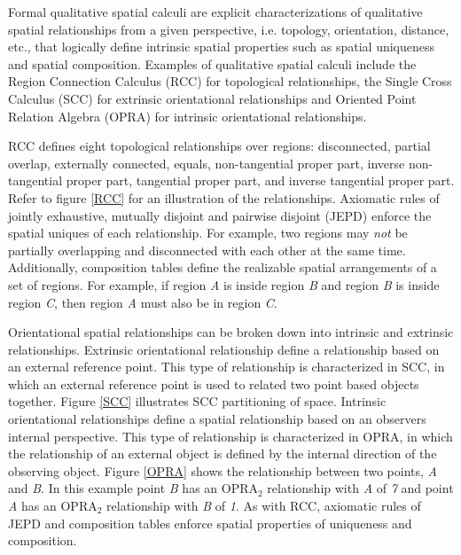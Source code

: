 \documentclass[12pt]{ucthesis}
\begin{document}
Formal qualitative spatial calculi are explicit characterizations of qualitative spatial relationships from a given perspective, i.e. topology, orientation, distance, etc., that logically define intrinsic spatial properties such as spatial uniqueness and spatial composition. Examples of qualitative spatial calculi include the Region Connection Calculus (RCC) \cite{Randell92aspatial} for topological relationships, the Single Cross Calculus (SCC) for extrinsic orientational relationships \cite{Freksa92usingorientation} and Oriented Point Relation Algebra (OPRA) \cite{Moratz} for intrinsic orientational relationships.

RCC defines eight topological relationships over regions: disconnected, partial overlap, externally connected, equals, non-tangential proper part, inverse non-tangential proper part, tangential proper part, and inverse tangential proper part. Refer to figure \ref{RCC} for an illustration of the relationships. Axiomatic rules of jointly exhaustive, mutually disjoint and pairwise disjoint (JEPD) enforce the spatial uniques of each relationship. For example, two regions may \emph{not} be partially overlapping and disconnected with each other at the same time. Additionally, composition tables define the realizable spatial arrangements of a set of regions. For example, if region \emph{A} is inside region \emph{B} and region \emph{B} is inside region \emph{C}, then region \emph{A} must also be in region \emph{C}.

Orientational spatial relationships can be broken down into intrinsic and extrinsic relationships. Extrinsic orientational relationship define a relationship based on an external reference point. This type of relationship is characterized in SCC, in which an external reference point is used to related two point based objects together. Figure \ref{SCC} illustrates SCC partitioning of space. Intrinsic orientational relationships define a spatial relationship based on an observers internal perspective. This type of relationship is characterized in OPRA, in which the relationship of an external object is defined by the internal direction of the observing object. Figure \ref{OPRA} shows the relationship between two points, \emph{A} and \emph{B}. In this example point \emph{B} has an OPRA$_{2}$ relationship with \emph{A} of \emph{7} and point \emph{A} has an OPRA$_{2}$ relationship with \emph{B} of \emph{1}. As with RCC, axiomatic rules of JEPD and composition tables enforce spatial properties of uniqueness and composition.
\end{document}
